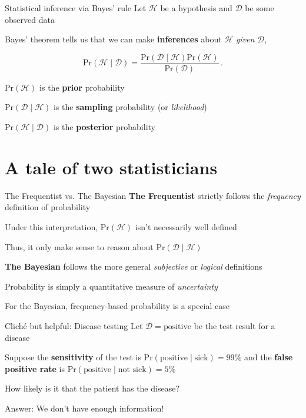 \documentclass[12pt,aspectratio=169]{beamer}
\newcommand{\prob}{\text{Pr}}
\begin{document}
\begin{frame}{Statistical inference via Bayes' rule}
    Let $\mathcal{H}$ be a hypothesis and $\mathcal{D}$ be some observed data
    \pause\newline

    Bayes' theorem tells us that we can make \textbf{inferences} about $\mathcal{H}$ \textit{given} $\mathcal{D}$,

    $$
    \prob(\mathcal{H} \mid \mathcal{D}) = \frac{\prob(\mathcal{D}\mid \mathcal{H})\prob(\mathcal{H})}{\prob(\mathcal{D})}\,.
    $$
    \pause

    $\prob(\mathcal{H})$ is the \textbf{prior} probability
    \pause

    $\prob(\mathcal{D} \mid \mathcal{H})$ is the \textbf{sampling} probability (or \textit{likelihood})
    \pause

    $\prob(\mathcal{H} \mid \mathcal{D})$ is the \textbf{posterior} probability
\end{frame}

\section{A tale of two statisticians}

\begin{frame}{The Frequentist vs. The Bayesian}
    \textbf{The Frequentist} strictly follows the \textit{frequency} definition of probability
    \pause

    Under this interpretation, $\prob(\mathcal{H})$ isn't necessarily well defined
    \pause

    Thus, it only make sense to reason about $\prob(\mathcal{D} \mid \mathcal{H})$
    \pause\newline
    
    \textbf{The Bayesian} follows the more general \textit{subjective} or \textit{logical} definitions
    \pause

    Probability is simply a quantitative measure of \textit{uncertainty}
    \pause

    For the Bayesian, frequency-based probability is a special case
\end{frame}

\begin{frame}{Cliché but helpful: Disease testing}
    Let $\mathcal{D} = \text{positive}$ be the test result for a disease
    \pause\newline

    Suppose the \textbf{sensitivity} of the test is $\prob(\text{positive} \mid \text{sick}) = 99\%$ and the \textbf{false positive rate} is $\prob(\text{positive} \mid \text{not sick}) = 5\%$
    \pause\newline

    How likely is it that the patient has the disease?
    \pause\newline

    Answer: We don't have enough information!
    
\end{frame}
\end{document}
